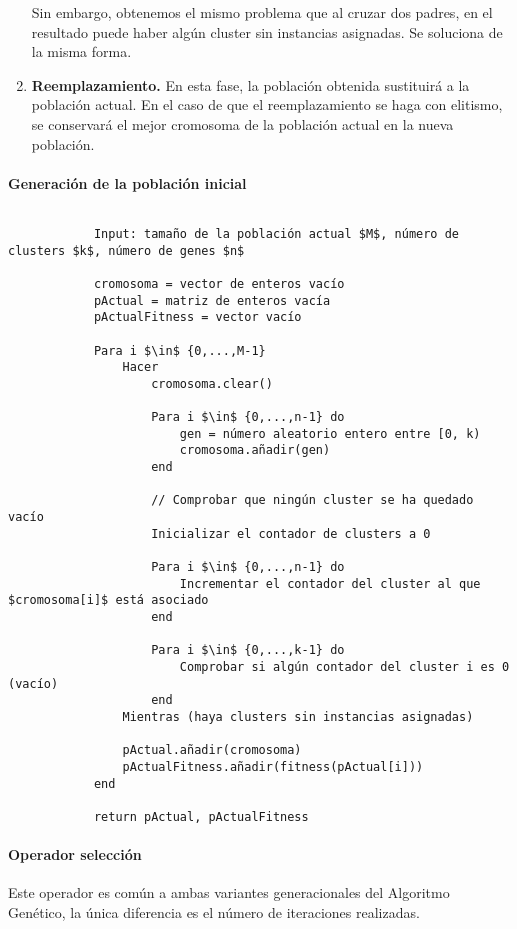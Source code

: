 \begin{enumerate}
				Sin embargo, obtenemos el mismo problema que al cruzar dos padres, en el resultado puede haber algún cluster sin instancias asignadas. Se soluciona de la misma forma.

			\item \textbf{Reemplazamiento.} En esta fase, la población obtenida sustituirá a la población actual. En el caso de que el reemplazamiento se haga con elitismo, 
				se conservará el mejor cromosoma de la población actual en la nueva población.
		\end{enumerate}
		\newpage
		\paragraph{Generación de la población inicial}
		$ $\\
		\footnotesize
		\begin{lstlisting}
			Input: tamaño de la población actual $M$, número de clusters $k$, número de genes $n$
			
			cromosoma = vector de enteros vacío
			pActual = matriz de enteros vacía
			pActualFitness = vector vacío

			Para i $\in$ {0,...,M-1}
				Hacer
					cromosoma.clear()
					
					Para i $\in$ {0,...,n-1} do 
						gen = número aleatorio entero entre [0, k)
						cromosoma.añadir(gen)
					end
					
					// Comprobar que ningún cluster se ha quedado vacío
					Inicializar el contador de clusters a 0
					
					Para i $\in$ {0,...,n-1} do 
						Incrementar el contador del cluster al que $cromosoma[i]$ está asociado
					end
					
					Para i $\in$ {0,...,k-1} do
						Comprobar si algún contador del cluster i es 0 (vacío)
					end
				Mientras (haya clusters sin instancias asignadas)

				pActual.añadir(cromosoma)
				pActualFitness.añadir(fitness(pActual[i]))
			end

			return pActual, pActualFitness
		\end{lstlisting}
		\normalsize

		\paragraph{Operador selección}
		$ $\\
		Este operador es común a ambas variantes generacionales del Algoritmo Genético, la única diferencia es el número de iteraciones realizadas.

